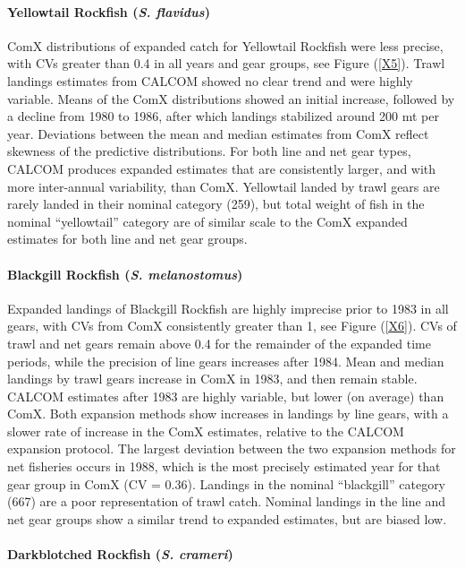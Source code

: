 \documentclass[12pt]{article}
\begin{document}
\paragraph{Yellowtail Rockfish (\textit{S. flavidus})}

ComX distributions of expanded catch for Yellowtail Rockfish were less 
precise, with CVs greater than 0.4 in all years and gear groups, see 
Figure (\ref{X5}).  Trawl landings estimates from CALCOM showed no clear trend 
and were highly variable. Means of the ComX distributions showed an initial 
increase, followed by a decline from 1980 to 1986, after which landings 
stabilized around 200 mt per year. Deviations between the mean and median 
estimates from ComX reflect skewness of the predictive distributions. For both 
line and net gear types, CALCOM produces expanded estimates that are 
consistently larger, and with more inter-annual variability, than ComX. 
Yellowtail landed by trawl gears are rarely landed in their nominal category 
(259), but total weight of fish in the nominal ``yellowtail'' category are of 
similar scale to the ComX expanded estimates for both line and net gear 
groups.

\paragraph{Blackgill Rockfish (\textit{S. melanostomus})}

Expanded landings of Blackgill Rockfish are highly imprecise prior to 1983 in 
all gears, with CVs from ComX consistently greater than 1, see Figure (\ref{X6}). 
CVs of trawl and net gears remain above 0.4 for the remainder of the expanded 
time periods, while the precision of line gears increases after 1984. Mean 
and median landings by trawl gears increase in ComX in 1983, and then 
remain stable. CALCOM estimates after 1983 are highly variable, but lower 
(on average) than ComX. Both expansion methods show increases in landings by 
line gears, with a slower rate of increase in the ComX estimates, relative to 
the CALCOM expansion protocol. The largest deviation between the two 
expansion methods for net fisheries occurs in 1988, which is the most 
precisely estimated year for that gear group in ComX (CV = 0.36). Landings in 
the nominal ``blackgill'' category (667) are a poor representation of trawl 
catch. Nominal landings in the line and net gear groups show a similar trend 
to expanded estimates, but are biased low.

\paragraph{Darkblotched Rockfish (\textit{S. crameri})}
\end{document}
